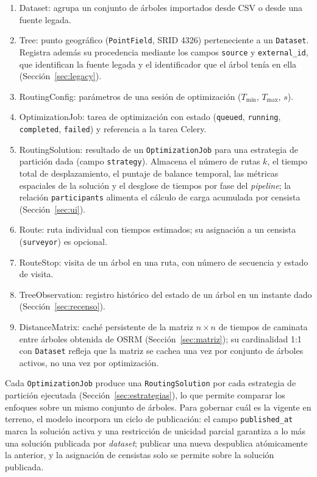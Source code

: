 \begin{enumerate}
  \item Dataset: agrupa un conjunto de árboles importados desde CSV o desde una fuente legada.
  \item Tree: punto geográfico (\texttt{PointField}, SRID 4326) perteneciente a un \texttt{Dataset}.
        Registra además su procedencia mediante los campos \texttt{source} y \texttt{external\_id},
        que identifican la fuente legada y el identificador que el árbol tenía en ella
        (Sección~\ref{sec:legacy}).
  \item RoutingConfig: parámetros de una sesión de optimización ($T_{\min}$, $T_{\max}$, $s$).
  \item OptimizationJob: tarea de optimización con estado (\texttt{queued}, \texttt{running},
        \texttt{completed}, \texttt{failed}) y referencia a la tarea Celery.
  \item RoutingSolution: resultado de un \texttt{OptimizationJob} para una estrategia de partición
        dada (campo \texttt{strategy}). Almacena el número de rutas $k$, el tiempo total de
        desplazamiento, el puntaje de balance temporal, las métricas espaciales de la solución y el
        desglose de tiempos por fase del \textit{pipeline}; la relación \texttt{participants}
        alimenta el cálculo de carga acumulada por censista (Sección~\ref{sec:ui}).
  \item Route: ruta individual con tiempos estimados; su asignación a un censista 
        (\texttt{surveyor}) es opcional.
  \item RouteStop: visita de un árbol en una ruta, con número de secuencia y estado de
        visita.
  \item TreeObservation: registro histórico del estado de un árbol en un instante dado
        (Sección~\ref{sec:recenso}).
  \item DistanceMatrix: caché persistente de la matriz $n \times n$ de tiempos de caminata entre
        árboles obtenida de OSRM (Sección~\ref{sec:matriz}); su cardinalidad 1:1 con
        \texttt{Dataset} refleja que la matriz se cachea una vez por conjunto de árboles activos,
        no una vez por optimización.
\end{enumerate}


Cada \texttt{OptimizationJob} produce una \texttt{RoutingSolution} por cada estrategia de partición
ejecutada (Sección~\ref{sec:estrategias}), lo que permite comparar los enfoques sobre un mismo
conjunto de árboles. Para gobernar cuál es la vigente en terreno, el modelo incorpora un ciclo de
publicación: el campo \texttt{published\_at} marca la solución activa y una restricción de unicidad
parcial garantiza a lo más una solución publicada por \textit{dataset}; publicar una nueva
despublica atómicamente la anterior, y la asignación de censistas solo se permite sobre la solución
publicada.

